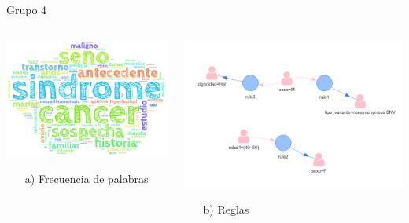 \documentclass[xcolor=dvipsnames]{beamer}
\begin{document}
\begin{frame}{Grupo 4}
\begin{columns}
\begin{column}{0.5\textwidth}
\begin{center}
\includegraphics[width=1\textwidth]{cluster4.png} \\
\begin{itemize}
    \item[a)] Frecuencia de palabras
\end{itemize}
\end{center}
\end{column}
\begin{column}{0.5\textwidth}  %
    \begin{center}
     \includegraphics[width=1\textwidth]{reglas4_2.png}
    \begin{itemize} 
    \centering
    \item[b)] Reglas
    \end{itemize}
    \end{center}
\end{column}
\end{columns}
\end{frame}
\end{document}
